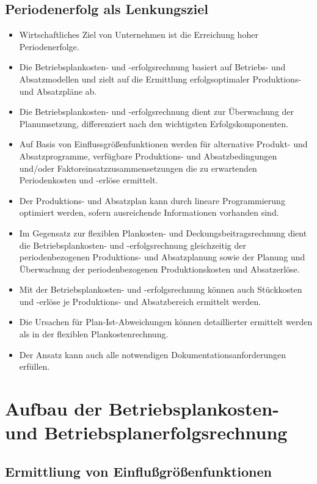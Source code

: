 \subsection{Periodenerfolg als Lenkungsziel}

\begin{itemize}
    \item Wirtschaftliches Ziel von Unternehmen ist die Erreichung hoher Periodenerfolge.
    \item Die Betriebsplankosten- und -erfolgsrechnung basiert auf Betriebs- und Absatzmodellen und zielt auf die Ermittlung erfolgsoptimaler Produktions- und Absatzpläne ab.
    \item Die Betriebsplankosten- und -erfolgsrechnung dient zur Überwachung der Planumsetzung, differenziert nach den wichtigsten Erfolgskomponenten.
    \item Auf Basis von Einflussgrö{\ss}enfunktionen werden für alternative Produkt- und Absatzprogramme, verfügbare Produktions- und Absatzbedingungen und/oder Faktoreinsatzzusammensetzungen die zu erwartenden Periodenkosten und -erlöse ermittelt.
    \item Der Produktions- und Absatzplan kann durch lineare Programmierung optimiert werden, sofern ausreichende Informationen vorhanden sind.
    \item Im Gegensatz zur flexiblen Plankosten- und Deckungsbeitragsrechnung dient die Betriebsplankosten- und -erfolgsrechnung gleichzeitig der periodenbezogenen Produktions- und Absatzplanung sowie der Planung und Überwachung der periodenbezogenen Produktionskosten und Absatzerlöse.
    \item Mit der Betriebsplankosten- und -erfolgsrechnung können auch Stückkosten und -erlöse je Produktions- und Absatzbereich ermittelt werden.
    \item Die Ursachen für Plan-Ist-Abweichungen können detaillierter ermittelt werden als in der flexiblen Plankostenrechnung.
    \item Der Ansatz kann auch alle notwendigen Dokumentationsanforderungen erfüllen.
\end{itemize}

\section{Aufbau der Betriebsplankosten- und Betriebsplanerfolgsrechnung}

\subsection{Ermittliung von Einflu{\ss}grö{\ss}enfunktionen}

